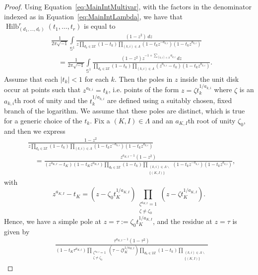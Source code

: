 \documentclass{amsart}
\theoremstyle{definition}
\theoremstyle{remark}
\newcommand{\Sp}{\mathbb{S}}
\newcommand{\Z}{\mathbb{Z}}
\newcommand{\Hilb}{\operatorname{Hilb}}
\begin{document}
\begin{proof}
Using Equation~\eqref{eq:MainIntMultivar}, with the factors in the denominator indexed as in
Equation~\eqref{eq:MainIntLambda}, we have that $\Hilb_{(d_1,\ldots, d_r)}^r(t_1,\ldots,t_r)$
is equal to
\begin{align*}
    &\frac{1}{2\pi\sqrt{-1}}\int\limits_{\Sp^1}
        \frac{ (1 - z^2) \, dz}
        {z  \prod\limits_{d_k\in 2\Z}(1 - t_k) \prod\limits_{(k,i)\in\Lambda}
            (1 - t_k z^{-a_{k,i}})(1 - t_k z^{a_{k,i}})}\\
    & \quad =
    \frac{1}{2\pi\sqrt{-1}}\int\limits_{\Sp^1}
        \frac{(1 - z^2) z^{-1+\sum_{(k,i)\in\Lambda} a_{k,i}} \, dz}
        {  \prod\limits_{d_k\in 2\Z}(1 - t_k) \prod\limits_{(k,i)\in\Lambda}
            (z^{a_{k,i}} - t_k)(1 - t_k z^{a_{k,i}})}.
\end{align*}
Assume that each $|t_k| < 1$ for each $k$. Then the poles in $z$ inside the unit disk occur at points such that
$z^{a_{k,i}} = t_k$, i.e. points of the form $z = \zeta t_k^{1/a_{k,i}}$ where
$\zeta$ is an $a_{k,i}$th root of unity and the $ t_k^{1/a_{k,i}}$ are defined using
a suitably chosen, fixed branch of the logarithm. We assume that these poles are distinct,
which is true for a generic choice of the $t_k$.
Fix a $(K,I)\in\Lambda$ and an
$a_{K,I}$th root of unity $\zeta_0$, and then we express
\begin{align*}
    &\frac{ 1 - z^2}
    {z \prod\limits_{d_k\in 2\Z}(1 - t_k) \prod\limits_{(k,i)\in\Lambda}
        (1 - t_k z^{-a_{k,i}})(1 - t_k z^{a_{k,i}})}
    \\&\quad=
    \frac{ z^{a_{K,I} - 1} (1 - z^2)}
    {(z^{a_{K,I}} - t_K) (1 - t_K z^{a_{K,I}}) \prod\limits_{d_k\in 2\Z}(1 - t_k)
        \prod\limits_{\substack{(k,i)\in\Lambda\smallsetminus \\ \{(K,I)\}}}
            (1 - t_k z^{-a_{k,i}})(1 - t_k z^{a_{k,i}}) },
\end{align*}
with
\[
    z^{a_{K,I}} - t_K = (z - \zeta_0 t_K^{1/a_{K,I}})
        \prod\limits_{\substack{\zeta^{a_{K,I}} = 1\\ \zeta\neq\zeta_0}} (z - \zeta t_K^{1/a_{K,I}}).
\]
Hence, we have a simple pole at $z = \tau:= \zeta_0 t_K^{1/a_{K,I}}$, and the residue at $z = \tau$
is given by
\begin{align*}
    &\frac{ \tau^{a_{K,I} - 1} (1 - \tau^2)}
    {(1 - t_K \tau^{a_{K,I}})
        \prod\limits_{\substack{\zeta^{a_{K,I}} = 1\\ \zeta\neq\zeta_0}} (\tau - \zeta t_K^{1/a_{K,I}})
        \prod\limits_{d_k\in 2\Z}(1 - t_k) \prod\limits_{\substack{(k,i)\in\Lambda\smallsetminus \\ \{(K,I)\}}}
}
\end{align*}
\end{proof}
\end{document}
